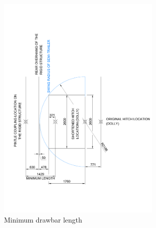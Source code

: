 \begin{figure}[H]
	\centering
	\includegraphics[width=0.7\textwidth]{fig/baseline-pintle-hitch-minimum-length}
	\caption{Minimum drawbar length}
	\label{figure:minimum-drawbar-length}
\end{figure}

